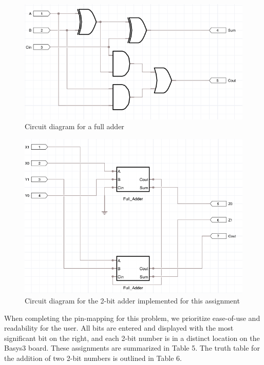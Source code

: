 \documentclass[11pt]{article}
\begin{document}
\begin{figure}
	\includegraphics[width=\textwidth]{report_images/img3}
	\caption{\label{fig:figure-name}Circuit diagram for a full adder}
\end{figure}

\begin{figure}
	\includegraphics[width=\textwidth]{report_images/img4}
	\caption{\label{fig:figure-name}Circuit diagram for the 2-bit adder implemented for this assignment}
\end{figure}

When completing the pin-mapping for this problem, we prioritize ease-of-use and readability for the user. All bits are entered and displayed with the most significant bit on the right, and each 2-bit number is in a distinct location on the Basys3 board. These assignments are summarized in Table 5. The truth table for the addition of two 2-bit numbers is outlined in Table 6.
\end{document}
